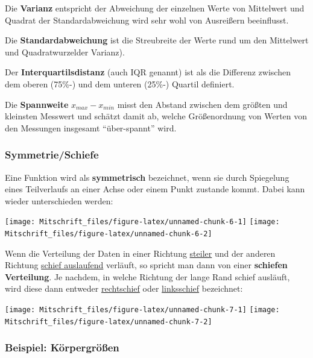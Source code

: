 \documentclass[
]{article}
\begin{document}
\tcolorbox

Die \textbf{Varianz} entspricht der Abweichung der einzelnen Werte von
Mittelwert und Quadrat der Standardabweichung wird sehr wohl von
Ausreißern beeinflusst. \endtcolorbox

\tcolorbox

Die \textbf{Standardabweichung} ist die Streubreite der Werte rund um
den Mittelwert und Quadratwurzelder Varianz). \endtcolorbox

\tcolorbox

Der \textbf{Interquartilsdistanz} (auch IQR genannt) ist als die
Differenz zwischen dem oberen (75\%-) und dem unteren (25\%-) Quartil
definiert. \endtcolorbox

\tcolorbox

Die \textbf{Spannweite} \(x_{max} - x_{min}\) misst den Abstand zwischen
dem größten und kleinsten Messwert und schätzt damit ab, welche
Größenordnung von Werten von den Messungen insgesamt ``über-spannt''
wird. \endtcolorbox

\hypertarget{symmetrieschiefe}{%
\subsubsection{Symmetrie/Schiefe}\label{symmetrieschiefe}}

\tcolorbox

Eine Funktion wird als \textbf{symmetrisch} bezeichnet, wenn sie durch
Spiegelung eines Teilverlaufs an einer Achse oder einem Punkt zustande
kommt. Dabei kann wieder unterschieden werden:

\texttt{[image: Mitschrift\_files/figure-latex/unnamed-chunk-6-1]}
\texttt{[image: Mitschrift\_files/figure-latex/unnamed-chunk-6-2]}
\endtcolorbox

\tcolorbox

Wenn die Verteilung der Daten in einer Richtung \underline{steiler} und
der anderen Richtung \underline{schief auslaufend} verläuft, so spricht
man dann von einer \textbf{schiefen Verteilung}. Je nachdem, in welche
Richtung der lange Rand schief ausläuft, wird diese dann entweder
\underline{rechtschief} oder \underline{linksschief} bezeichnet:

\texttt{[image: Mitschrift\_files/figure-latex/unnamed-chunk-7-1]}
\texttt{[image: Mitschrift\_files/figure-latex/unnamed-chunk-7-2]}
\endtcolorbox

\hypertarget{beispiel-kuxf6rpergruxf6uxdfen}{%
\subsubsection{Beispiel:
Körpergrößen}\label{beispiel-kuxf6rpergruxf6uxdfen}}
\end{document}
